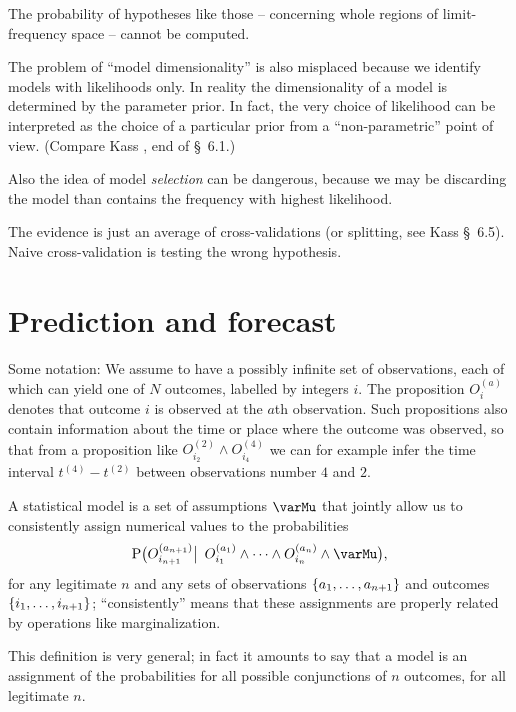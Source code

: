 \documentclass[\ifafour a4paper,12pt,\else a5paper,10pt,\fi%
onecolumn,oneside,article,%
british%
]{memoir}
\theoremstyle{remark}
\theoremstyle{innote}
\newcommand*{\citey}{\parencites*}
\DeclarePairedDelimiter\set{\{}{\}}
\newcommand*{\p}{\mathrm{P}}%
\renewcommand*{\|}{\mathpunct{|}}
\newcommand*{\lcond}[1][]{\mathpunct{#1|\ }}%
\newcommand*{\sect}{\S}%
\newcommand*{\yO}[2]{O^{(#1)}_{#2}}
\newcommand*{\yM}{\varMu}
\begin{document}
The probability of hypotheses like those -- concerning whole regions of
limit-frequency space -- cannot be computed.

The problem of \enquote{model dimensionality} is also misplaced because we
identify models with likelihoods only. In reality the dimensionality of a
model is determined by the parameter prior. In fact, the very choice of
likelihood can be interpreted as the choice of a particular prior from a
\enquote{non-parametric} point of view. (Compare Kass \citey{kassetal1995},
end of \sect~6.1.)

Also the idea of model \emph{selection} can be dangerous, because we may be
discarding the model than contains the frequency with highest likelihood.

The evidence is just an average of cross-validations (or splitting, see
Kass \sect~6.5). Naive cross-validation is testing the wrong hypothesis.



\section{Prediction and forecast}
\label{sec:intro}

Some notation: We assume to have a possibly infinite set of observations,
each of which can yield one of $N$ outcomes, labelled by integers $i$. The
proposition $\yO{a}{i}$ denotes that outcome $i$ is observed at the $a$th
observation. Such propositions also contain information about the time or
place where the outcome was observed, so that from a proposition like
$\yO{2}{i_2} \land \yO{4}{i_4}$ we can for example infer the time interval
$t^{(4)}-t^{(2)}$ between observations number $4$ and $2$.

A statistical model is a set of assumptions $\yM$ that jointly allow us to
consistently assign numerical values to the probabilities
\begin{equation}
  \label{eq:def_statmod}
  \p\bigl(\yO{a_{n+1}}{i_{n+1}} \lcond[\big]
  \yO{a_{1}}{i_{1}} \land \dotsb \land \yO{a_{n}}{i_{n}} \land \yM \bigr),
\end{equation}
for any legitimate $n$ and any sets of observations
$\set{a_{1}, \dotsc, a_{n+1}}$ and outcomes $\set{i_{1}, \dotsc, i_{n+1}}$;
\enquote{consistently} means that these assignments are properly related by
operations like marginalization.

This definition is very general; in fact it amounts to say that a model is
an assignment of the probabilities for all possible conjunctions of $n$
outcomes, for all legitimate $n$.
\end{document}
